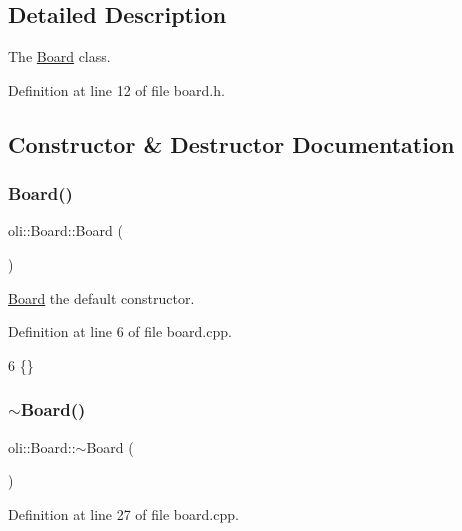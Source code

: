 \subsection{Detailed Description}
The \hyperlink{classoli_1_1_board}{Board} class. 

Definition at line 12 of file board.\+h.



\subsection{Constructor \& Destructor Documentation}
\hypertarget{classoli_1_1_board_a20734da03f3278f4160713deee5ea08e}{}\label{classoli_1_1_board_a20734da03f3278f4160713deee5ea08e} 
\subsubsection{\texorpdfstring{Board()}{Board()}\hspace{0.1cm}{\footnotesize\ttfamily [1/2]}}
{\footnotesize\ttfamily oli\+::\+Board\+::\+Board (\begin{DoxyParamCaption}{ }\end{DoxyParamCaption})}



\hyperlink{classoli_1_1_board}{Board} the default constructor. 



Definition at line 6 of file board.\+cpp.


\begin{DoxyCode}
6 \{\}
\end{DoxyCode}
\hypertarget{classoli_1_1_board_af768f5fed76ddda7696e73657ad0fadf}{}\label{classoli_1_1_board_af768f5fed76ddda7696e73657ad0fadf} 
\subsubsection{\texorpdfstring{$\sim$\+Board()}{~Board()}}
{\footnotesize\ttfamily oli\+::\+Board\+::$\sim$\+Board (\begin{DoxyParamCaption}{ }\end{DoxyParamCaption})}



Definition at line 27 of file board.\+cpp.


